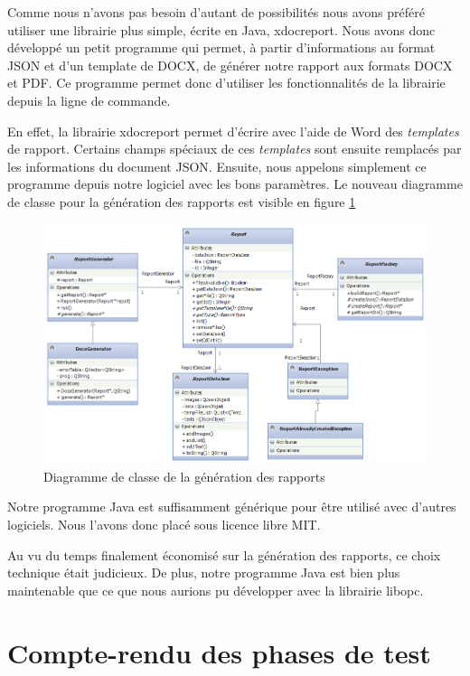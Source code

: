 \documentclass[a4paper,titlepage,french]{report}
\begin{document}
Comme nous n'avons pas besoin d'autant de possibilités nous avons préféré utiliser une librairie plus simple, écrite en Java, xdocreport. %
Nous avons donc développé un petit programme qui permet, à partir d'informations au format JSON et d'un template de DOCX, de générer notre rapport aux formats DOCX et PDF.
Ce programme permet donc d'utiliser les fonctionnalités de la librairie depuis la ligne de commande.

En effet, la librairie xdocreport permet d'écrire avec l'aide de Word des \textit{templates} de rapport.
Certains champs spéciaux de ces \textit{templates} sont ensuite remplacés par les informations du document JSON.
Ensuite, nous appelons simplement ce programme depuis notre logiciel avec les bons paramètres.
Le nouveau diagramme de classe pour la génération des rapports est visible en figure \ref{fig:class-diagram-report-generation}

\begin{figure}[h]
 	\center
  	\includegraphics[scale=0.65]{class-diagram-report-generation.png}
  	\caption{Diagramme de classe de la génération des rapports}
	\label{fig:class-diagram-report-generation}
\end{figure}

Notre programme Java est suffisamment générique pour être utilisé avec d'autres logiciels.
Nous l'avons donc placé sous licence libre MIT. %

Au vu du temps finalement économisé sur la génération des rapports, ce choix technique était judicieux.
De plus, notre programme Java est bien plus maintenable que ce que nous aurions pu développer avec la librairie libopc.


\chapter{Compte-rendu des phases de test}
\end{document}
